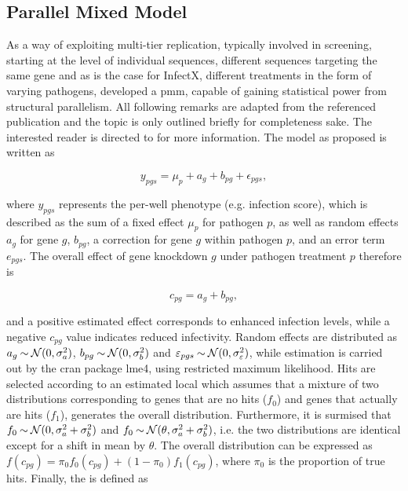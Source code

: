 \subsection{Parallel Mixed Model}
\label{sub:pmm}
As a way of exploiting multi-tier replication, typically involved in  screening, starting at the level of individual sequences, different sequences targeting the same gene and as is the case for InfectX, different treatments in the form of varying pathogens, \citeauthor{Ramo2014} developed a \acrfull{pmm}, capable of gaining statistical power from structural parallelism. All following remarks are adapted from the referenced publication and the topic is only outlined briefly for completeness sake. The interested reader is directed to \citet{Ramo2014} for more information. The model as proposed is written as

\begin{equation}
  y_{pgs} = \mu_p + a_g + b_{pg} + \epsilon_{pgs},
\end{equation}

where $y_{pgs}$ represents the per-well phenotype (e.g. infection score), which is described as the sum of a fixed effect $\mu_p$ for pathogen $p$, as well as random effects $a_g$ for gene $g$, $b_{pg}$, a correction for gene $g$ within pathogen $p$, and an error term $e_{pgs}$. The overall effect of gene knockdown $g$ under pathogen treatment $p$ therefore is 

\begin{equation}
  c_{pg} = a_g + b_{pg},
\end{equation}

and a positive estimated effect corresponds to enhanced infection levels, while a negative $c_{pg}$ value indicates reduced infectivity. Random effects are distributed as $a_g \mathbin{\sim} \operatorname{\mathcal{N}}(0, \sigma_a^2)$, $b_{pg} \mathbin{\sim} \operatorname{\mathcal{N}}(0, \sigma_b^2)$ and $\varepsilon_{pgs} \mathbin{\sim} \operatorname{\mathcal{N}}(0, \sigma_\varepsilon^2)$, while estimation is carried out by the \acrshort{cran} package lme4, using restricted maximum likelihood. Hits are selected according to an estimated local  which assumes that a mixture of two distributions corresponding to genes that are no hits ($f_0$) and genes that actually are hits ($f_1$), generates the overall distribution. Furthermore, it is surmised that $f_0 \mathbin{\sim} \operatorname{\mathcal{N}}(0, \sigma_a^2+\sigma_b^2)$ and $f_0 \mathbin{\sim} \operatorname{\mathcal{N}}(\theta, \sigma_a^2+\sigma_b^2)$, i.e. the two distributions are identical except for a shift in mean by $\theta$. The overall distribution can be expressed as $f(c_{pg}) = \pi_0 f_0(c_{pg}) + (1-\pi_0) f_1(c_{pg})$, where $\pi_0$ is the proportion of true hits. Finally, the  is defined as

